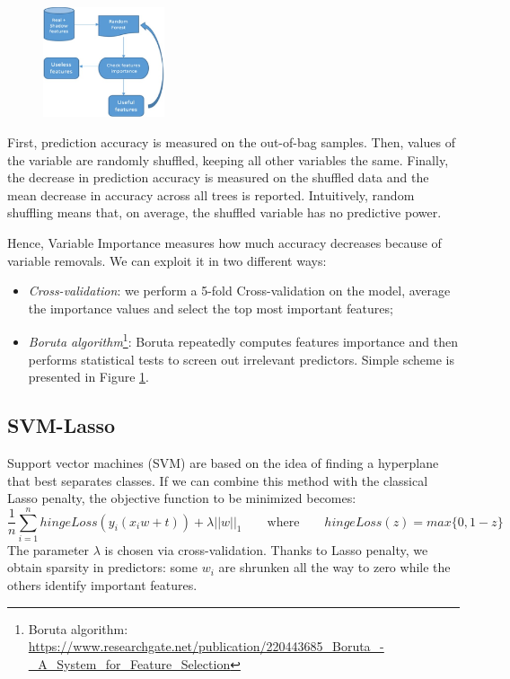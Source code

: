 \documentclass[a4paper,11pt, oneside]{article}  %
\begin{document}
\begin{figure}
	\includegraphics[width=0.318\textwidth]{Boruta-Algorithm.jpg}
	\label{fig2}
\end{figure}
First, prediction accuracy is measured on the out-of-bag samples. Then, values of the variable are randomly shuffled, keeping all other variables the same.  Finally, the decrease in prediction accuracy is measured on the shuffled data and the mean decrease in accuracy across all trees is reported.  Intuitively, random shuffling means that, on average, the shuffled variable has no predictive power. 

Hence, Variable Importance measures how much accuracy decreases because of variable removals. We can exploit it in two different ways:
\begin{itemize}
	\item \textit{Cross-validation}: we perform a 5-fold Cross-validation on the model, average the importance values and select the top most important features;
	\item \textit{Boruta algorithm}\footnote{Boruta algorithm: \url{https://www.researchgate.net/publication/220443685_Boruta_-_A_System_for_Feature_Selection}}: Boruta repeatedly computes features importance and then performs statistical tests to screen out irrelevant predictors. Simple scheme is presented in Figure \ref{fig2}.
\end{itemize} 
\newpage

\subsection{SVM-Lasso}
Support vector machines (SVM) are based on the idea of finding a hyperplane that best separates classes. If we can combine this method with the classical Lasso penalty, the objective function to be minimized becomes:
\begin{equation*}
	\dfrac{1}{n} \sum_{i=1}^n hingeLoss(y_i(x_i w + t)) + \lambda ||w||_1  \qquad	\text{where} \qquad  hingeLoss(z) = max\{0, 1-z\}
\end{equation*}
The parameter $\lambda$ is chosen via cross-validation. Thanks to Lasso penalty, we obtain sparsity in predictors: some $w_i$ are shrunken all the way to zero while the others identify important features. 
\end{document}
